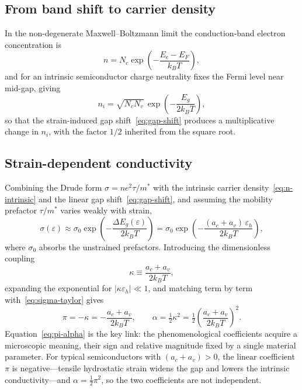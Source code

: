 \subsection{From band shift to carrier density}
\label{subsec:carrier-density}

In the non-degenerate Maxwell--Boltzmann limit the conduction-band electron
concentration is
\begin{equation}
  n = N_c \exp\!\left(-\frac{E_c - E_F}{k_B T}\right),
  \label{eq:n-extrinsic}
\end{equation}
and for an intrinsic semiconductor charge neutrality fixes the Fermi level near
mid-gap, giving
\begin{equation}
  n_i = \sqrt{N_c N_v}\,\exp\!\left(-\frac{E_g}{2 k_B T}\right),
  \label{eq:n-intrinsic}
\end{equation}
so that the strain-induced gap shift~\eqref{eq:gap-shift} produces a
multiplicative change in $n_i$, with the factor $1/2$ inherited from the
square root.

\subsection{Strain-dependent conductivity}
\label{subsec:sigma-law}

Combining the Drude form $\sigma = n e^2 \tau / m^\ast$ with the intrinsic
carrier density~\eqref{eq:n-intrinsic} and the linear gap
shift~\eqref{eq:gap-shift}, and assuming the mobility prefactor $\tau/m^\ast$
varies weakly with strain,
\begin{equation}
  \sigma(\varepsilon) \approx
  \sigma_0 \exp\!\left(-\frac{\Delta E_g(\varepsilon)}{2 k_B T}\right)
  = \sigma_0 \exp\!\left(-\frac{(a_c+a_v)\,\varepsilon_h}{2 k_B T}\right),
  \label{eq:sigma-exp}
\end{equation}
where $\sigma_0$ absorbs the unstrained prefactors. Introducing the
dimensionless coupling
\begin{equation}
  \kappa \equiv \frac{a_c+a_v}{2 k_B T},
  \label{eq:kappa}
\end{equation}
expanding the exponential for $|\kappa\varepsilon_h|\ll 1$, and matching
term by term with~\eqref{eq:sigma-taylor} gives
\begin{equation}
  \pi = -\kappa = -\frac{a_c+a_v}{2 k_B T}, \qquad
  \alpha = \tfrac{1}{2}\kappa^2 = \tfrac{1}{2}\!\left(\frac{a_c+a_v}{2 k_B T}\right)^{\!2}.
  \label{eq:pi-alpha}
\end{equation}
Equation~\eqref{eq:pi-alpha} is the key link: the phenomenological coefficients
acquire a microscopic meaning, their sign and relative magnitude fixed by a
single material parameter. For typical semiconductors with $(a_c+a_v)>0$, the
linear coefficient $\pi$ is negative---tensile hydrostatic strain widens the gap
and lowers the intrinsic conductivity---and $\alpha = \tfrac12\pi^2$, so the two
coefficients are not independent.

